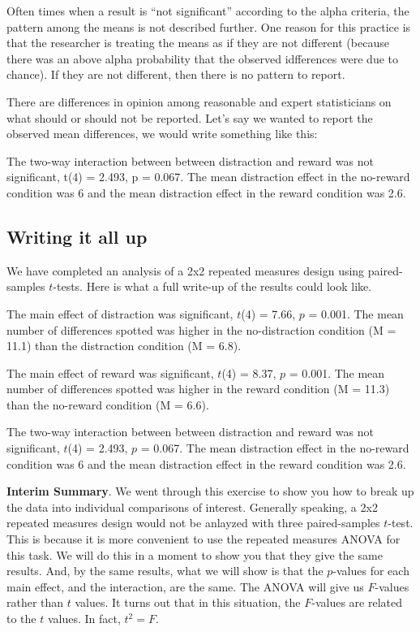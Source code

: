 \documentclass[
]{book}
\begin{document}
Often times when a result is ``not significant'' according to the alpha criteria, the pattern among the means is not described further. One reason for this practice is that the researcher is treating the means as if they are not different (because there was an above alpha probability that the observed idfferences were due to chance). If they are not different, then there is no pattern to report.

There are differences in opinion among reasonable and expert statisticians on what should or should not be reported. Let's say we wanted to report the observed mean differences, we would write something like this:

The two-way interaction between between distraction and reward was not significant, t(4) = 2.493, p = 0.067. The mean distraction effect in the no-reward condition was 6 and the mean distraction effect in the reward condition was 2.6.

\hypertarget{writing-it-all-up}{%
\subsection{Writing it all up}\label{writing-it-all-up}}

We have completed an analysis of a 2x2 repeated measures design using paired-samples \(t\)-tests. Here is what a full write-up of the results could look like.

The main effect of distraction was significant, \(t\)(4) = 7.66, \(p\) = 0.001. The mean number of differences spotted was higher in the no-distraction condition (M = 11.1) than the distraction condition (M = 6.8).

The main effect of reward was significant, \(t\)(4) = 8.37, \(p\) = 0.001. The mean number of differences spotted was higher in the reward condition (M = 11.3) than the no-reward condition (M = 6.6).

The two-way interaction between between distraction and reward was not significant, \(t\)(4) = 2.493, \(p\) = 0.067. The mean distraction effect in the no-reward condition was 6 and the mean distraction effect in the reward condition was 2.6.

\textbf{Interim Summary}. We went through this exercise to show you how to break up the data into individual comparisons of interest. Generally speaking, a 2x2 repeated measures design would not be anlayzed with three paired-samples \(t\)-test. This is because it is more convenient to use the repeated measures ANOVA for this task. We will do this in a moment to show you that they give the same results. And, by the same results, what we will show is that the \(p\)-values for each main effect, and the interaction, are the same. The ANOVA will give us \(F\)-values rather than \(t\) values. It turns out that in this situation, the \(F\)-values are related to the \(t\) values. In fact, \(t^2 = F\).
\end{document}
